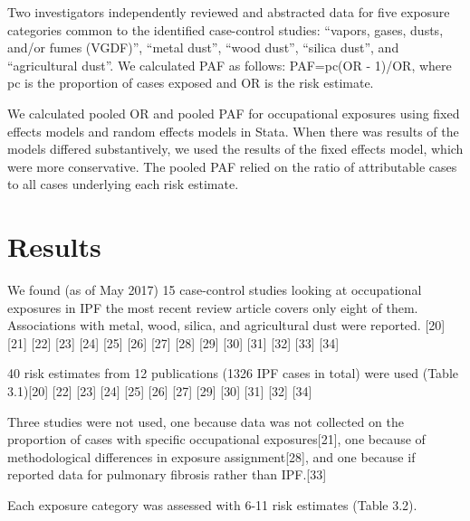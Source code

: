 \documentclass[12pt,a4paper,]{report}
\begin{document}
Two investigators independently reviewed and abstracted data for five
exposure categories common to the identified case-control studies:
``vapors, gases, dusts, and/or fumes (VGDF)'', ``metal dust'', ``wood
dust'', ``silica dust'', and ``agricultural dust''. We calculated PAF as
follows: PAF=pc(OR - 1)/OR, where pc is the proportion of cases exposed
and OR is the risk estimate.

We calculated pooled OR and pooled PAF for occupational exposures using
fixed effects models and random effects models in Stata. When there was
results of the models differed substantively, we used the results of the
fixed effects model, which were more conservative. The pooled PAF relied
on the ratio of attributable cases to all cases underlying each risk
estimate.

\hypertarget{results}{%
\section{Results}\label{results}}

We found (as of May 2017) 15 case-control studies looking at
occupational exposures in IPF the most recent review article covers only
eight of them. Associations with metal, wood, silica, and agricultural
dust were reported. {[}20{]} {[}21{]} {[}22{]} {[}23{]} {[}24{]}
{[}25{]} {[}26{]} {[}27{]} {[}28{]} {[}29{]} {[}30{]} {[}31{]} {[}32{]}
{[}33{]} {[}34{]}

40 risk estimates from 12 publications (1326 IPF cases in total) were
used (Table 3.1){[}20{]} {[}22{]} {[}23{]} {[}24{]} {[}25{]} {[}26{]}
{[}27{]} {[}29{]} {[}30{]} {[}31{]} {[}32{]} {[}34{]}

Three studies were not used, one because data was not collected on the
proportion of cases with specific occupational exposures{[}21{]}, one
because of methodological differences in exposure assignment{[}28{]},
and one because if reported data for pulmonary fibrosis rather than
IPF.{[}33{]}

Each exposure category was assessed with 6-11 risk estimates (Table
3.2).
\end{document}
